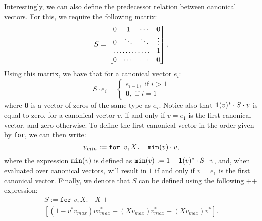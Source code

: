 Interestingly, we can also define the predecessor relation between canonical vectors. For this, we require the following matrix:
\[
S = \begin{bmatrix}
    0 & 1 & \cdots &  0 \\
    0 & \ddots & \ddots & \vdots \\
    \hdotsfor{3} & 1 \\
    0 & \cdots & \cdots & 0
\end{bmatrix},
\] 
Using this matrix, we have that for a canonical vector $e_i$:
\[
  			S\cdot e_i=\begin{cases}
               e_{i-1}, \text{ if } i > 1 \\
              \mathbf{0}, \text{ if } i = 1
            \end{cases}
		\]
where $\mathbf{0}$ is a vector of zeros of the same type as $e_i$. Notice also that $\mathbf{1}(v)^*\cdot S \cdot v$ is equal to zero, for a canonical vector $v$, if and only if $v = e_1$ is the first canonical vector, and zero otherwise. To define the first canonical vector in the order given by \texttt{for}, we can then write:
$$v_{min} := \texttt{for }v,X \texttt{. }\texttt{min}(v)\cdot v,$$
where the expression $\texttt{min}(v)$ is defined as $\texttt{min}(v) := 1 - \mathbf{1}(v)^*\cdot S \cdot v$, and, when evaluated over canonical vectors, will result in $1$ if and only if $v=e_1$ is the first canonical vector. Finally, we denote that $S$ can be defined using the following \lang++ expression:
\begin{multline*}
S:= \texttt{for }v,X.\quad X + \\
\left[ (1 - v^*v_{max})vv_{max}^* - (Xv_{max}) v_{max}^* + (Xv_{max})v^*\right].
\end{multline*}

